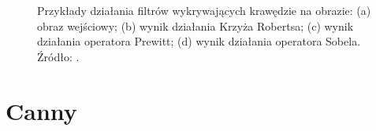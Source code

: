 \documentclass[a4paper,twocolumn,12pt]{article}
\begin{document}
\begin{figure}
 \begin{center}
 \end{center}
 \caption{
  Przykłady działania filtrów wykrywających krawędzie na obrazie:
  (a) obraz wejściowy;
  (b) wynik działania Krzyża Robertsa;
  (c) wynik działania operatora Prewitt;
  (d) wynik działania operatora Sobela.
  Źródło: \cite{maini}.
 }
 \label{fig:edges_comparison}
\end{figure}



\section{Canny}
\end{document}
